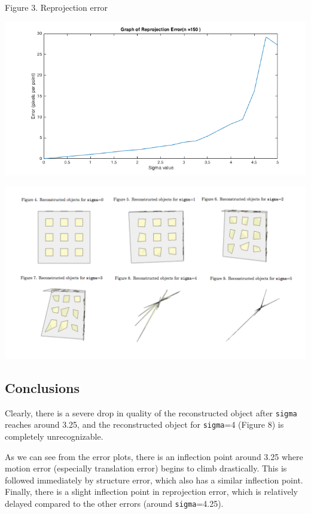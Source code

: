 \documentclass{article}
\begin{document}
\begin{center}
	\begin{center}Figure 3. Reprojection error\end{center}
	\includegraphics[width=.7\textwidth,keepaspectratio]{reprojection_error.png}

	\includegraphics[width=\textwidth,keepaspectratio]{reconstructed_objects.png}
\end{center}


\subsection{Conclusions}

Clearly, there is a severe drop in quality of the reconstructed object after \texttt{sigma} reaches around 3.25, and the reconstructed object for \texttt{sigma}=4 (Figure 8) is completely unrecognizable.

As we can see from the error plots, there is an inflection point around 3.25 where motion error (especially translation error) begins to climb drastically. This is followed immediately by structure error, which also has a similar inflection point. Finally, there is a slight inflection point in reprojection error, which is relatively delayed compared to the other errors (around \texttt{sigma}=4.25).
\end{document}
